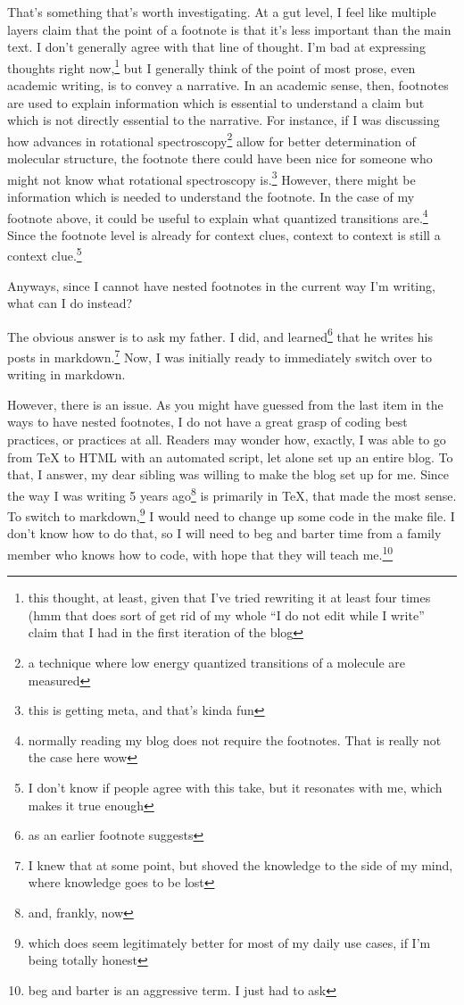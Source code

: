\documentclass[12pt]{article}[titlepage]
\newcommand{\say}[1]{``#1''}
\newcommand{\1}{\={a}}
\newcommand{\2}{\={e}}
\newcommand{\3}{\={\i}}
\newcommand{\4}{\=o}
\newcommand{\5}{\=u}
\newcommand{\6}{\={A}}
\renewcommand{\,}{\textsuperscript{,}}
\begin{document}
That's something that's worth investigating.
At a gut level, I feel like multiple layers claim that the point of a footnote is that it's less important than the main text.
I don't generally agree with that line of thought.
I'm bad at expressing thoughts right now,\footnote{this thought, at least, given that I've tried rewriting it at least four times (hmm that does sort of get rid of my whole \say{I do not edit while I write} claim that I had in the first iteration of the blog} but I generally think of the point of most prose, even academic writing, is to convey a narrative.
In an academic sense, then, footnotes are used to explain information which is essential to understand a claim but which is not directly essential to the narrative.
For instance, if I was discussing how advances in rotational spectroscopy\footnote{a technique where low energy quantized transitions of a molecule are measured} allow for better determination of molecular structure, the footnote there could have been nice for someone who might not know what rotational spectroscopy is.\footnote{this is getting meta, and that's kinda fun}
However, there might be information which is needed to understand the footnote.
In the case of my footnote above, it could be useful to explain what quantized transitions are.\footnote{normally reading my blog does not require the footnotes. That is really not the case here wow}
Since the footnote level is already for context clues, context to context is still a context clue.\footnote{I don't know if people agree with this take, but it resonates with me, which makes it true enough}

Anyways, since I cannot have nested footnotes in the current way I'm writing, what can I do instead?

The obvious answer is to ask my father.
I did, and learned\footnote{as an earlier footnote suggests} that he writes his posts in markdown.\footnote{I knew that at some point, but shoved the knowledge to the side of my mind, where knowledge goes to be lost}
Now, I was initially ready to immediately switch over to writing in markdown.

However, there is an issue.
As you might have guessed from the last item in the ways to have nested footnotes, I do not have a great grasp of coding best practices, or practices at all.
Readers may wonder how, exactly, I was able to go from TeX to HTML with an automated script, let alone set up an entire blog.
To that, I answer, my dear sibling was willing to make the blog set up for me.
Since the way I was writing 5 years ago\footnote{and, frankly, now} is primarily in TeX, that made the most sense.
To switch to markdown,\footnote{which does seem legitimately better for most of my daily use cases, if I'm being totally honest} I would need to change up some code in the make file.
I don't know how to do that, so I will need to beg and barter time from a family member who knows how to code, with hope that they will teach me.\footnote{beg and barter is an aggressive term. I just had to ask}
\end{document}
